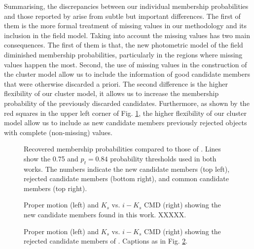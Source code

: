 Summarising, the discrepancies between our individual membership probabilities and those reported by \citet{Bouy2015} arise from subtle but important differences. The first of them is the more formal treatment of missing values in our methodology and its inclusion in the field model. Taking into account the missing values has two main consequences. The first of them is that, the new photometric model of the field diminished membership probabilities, particularly in the regions where missing values happen the most. Second, the use of missing values in the construction of the cluster model allow us to include the information of good candidate members that were otherwise discarded a priori. The second difference is the higher flexibility of our cluster model, it allows us to increase the membership probability of the previously discarded candidates. Furthermore, as shown by the red squares in the upper left corner of Fig. \ref{figure:HM-SBB}, the higher flexibility of our cluster model allow us to include as new candidate members previously rejected objects with complete (non-missing) values.  

\begin{figure}[htbp]
\begin{center}
\caption{Recovered membership probabilities compared to those of \citet{Bouy2015}. Lines show the 0.75 and $p_t=0.84$ probability thresholds used in both works. The numbers indicate the new candidate members (top left), rejected candidate members (bottom right), and common candidate members (top right).}
\label{figure:HM-SBB}
\end{center}
\end{figure}


 \begin{figure}[htbp]
\begin{center}
\caption{Proper motion (left) and $K_s$ vs. $i-K_s$ CMD (right) showing the new candidate members found in this work. XXXXX.}
\label{figure:newones}
\end{center}
\end{figure}

 \begin{figure}[htbp]
\begin{center}
\caption{Proper motion (left) and $K_s$ vs. $i-K_s$ CMD (right) showing the rejected candidate members of \citet{Bouy2015}. Captions as in Fig. \ref{figure:newones}.}
\label{figure:rejecteds}
\end{center}
\end{figure}

